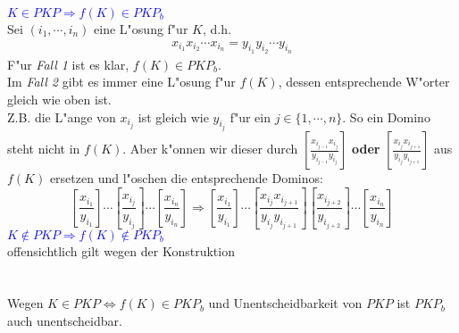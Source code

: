 \documentclass[a4paper,11pt]{scrartcl}
\begin{document}
	\noindent \textcolor{blue}{$K \in PKP \Longrightarrow f(K) \in PKP_b$}\\
	Sei $(i_1,\cdots ,i_n)$ eine L"osung f"ur $K$, d.h.
	\begin{align*}
		x_{i_1} x_{i_2} \cdots x_{i_n} = y_{i_1} y_{i_2} \cdots y_{i_n}
	\end{align*}
	F"ur \textit{Fall 1} ist es klar, $f(K) \in PKP_b$.\\
	Im \textit{Fall 2} gibt es immer eine L"osung f"ur $f(K)$, dessen entsprechende W"orter gleich wie oben ist.\\
	Z.B. die L"ange von $x_{i_j}$ ist gleich wie $y_{i_j}$ f"ur ein $j \in \{1,\cdots, n\}$. So ein Domino steht nicht in $f(K)$. Aber k"onnen wir dieser durch $\left[ \frac{x_{i_{j-1}} x_{i_j}}{y_{i_{j-1}} y_{i_j}} \right]$ \textbf{oder} $\left[ \frac{x_{i_{j}} x_{i_{j+1}}}{y_{i_{j}} y_{i_{j+1}}} \right]$ aus $f(K)$ ersetzen und l"oschen die entsprechende Dominos:\\
	$$
	  \left[ \frac{x_{i_{1}}}{y_{i_{1}}} \right] \cdots  \left[ \frac{x_{i_{j}}}{y_{i_{j}}} \right]  \cdots \left[ \frac{x_{i_{n}}}{y_{i_{n}}} \right] \Longrightarrow \left[ \frac{x_{i_{1}}}{y_{i_{1}}} \right] \cdots  \left[ \frac{x_{i_{j}} x_{i_{j+1}}}{y_{i_{j}} y_{i_{j+1}}} \right] \left[ \frac{x_{i_{j+2}}}{y_{i_{j+2}}} \right] \cdots \left[ \frac{x_{i_{n}}}{y_{i_{n}}} \right]
	$$
	\textcolor{blue}{$K \notin PKP \Longrightarrow f(K) \notin PKP_b$}\\
	offensichtlich gilt wegen der Konstruktion \\
	\\ \ \\
	Wegen $K\in PKP \iff f(K) \in PKP_b$ und Unentscheidbarkeit von $PKP$ ist $PKP_b$ auch unentscheidbar.
	

	
	
	
	
	
	
	
	
	
	
	
	
	
	
	

	
\end{document}
